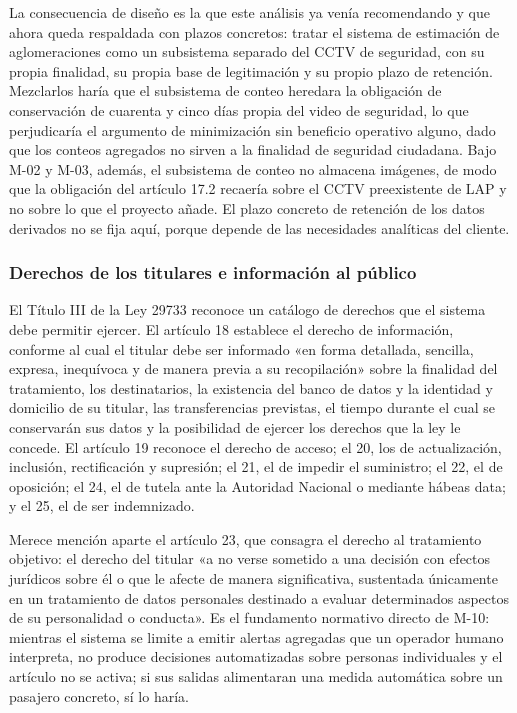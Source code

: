 La consecuencia de diseño es la que este análisis ya venía recomendando
y que ahora queda respaldada con plazos concretos: tratar el sistema de
estimación de aglomeraciones como un subsistema separado del CCTV de
seguridad, con su propia finalidad, su propia base de legitimación y su
propio plazo de retención. Mezclarlos haría que el subsistema de conteo
heredara la obligación de conservación de cuarenta y cinco días propia
del video de seguridad, lo que perjudicaría el argumento de minimización
sin beneficio operativo alguno, dado que los conteos agregados no sirven
a la finalidad de seguridad ciudadana. Bajo M-02 y M-03, además, el
subsistema de conteo no almacena imágenes, de modo que la obligación del
artículo 17.2 recaería sobre el CCTV preexistente de LAP y no sobre lo
que el proyecto añade. El plazo concreto de retención de los datos
derivados no se fija aquí, porque depende de las necesidades analíticas
del cliente.

\subsubsection{Derechos de los titulares e información al público}

El Título III de la Ley 29733 reconoce un catálogo de derechos que el
sistema debe permitir ejercer. El artículo 18 establece el derecho de
información, conforme al cual el titular debe ser informado «en forma
detallada, sencilla, expresa, inequívoca y de manera previa a su
recopilación» sobre la finalidad del tratamiento, los destinatarios, la
existencia del banco de datos y la identidad y domicilio de su titular,
las transferencias previstas, el tiempo durante el cual se conservarán
sus datos y la posibilidad de ejercer los derechos que la ley le
concede. El artículo 19 reconoce el derecho de acceso; el 20, los de
actualización, inclusión, rectificación y supresión; el 21, el de
impedir el suministro; el 22, el de oposición; el 24, el de tutela ante
la Autoridad Nacional o mediante hábeas data; y el 25, el de ser
indemnizado.

Merece mención aparte el artículo 23, que consagra el derecho al
tratamiento objetivo: el derecho del titular «a no verse sometido a una
decisión con efectos jurídicos sobre él o que le afecte de manera
significativa, sustentada únicamente en un tratamiento de datos
personales destinado a evaluar determinados aspectos de su personalidad
o conducta». Es el fundamento normativo directo de M-10: mientras el
sistema se limite a emitir alertas agregadas que un operador humano
interpreta, no produce decisiones automatizadas sobre personas
individuales y el artículo no se activa; si sus salidas alimentaran una
medida automática sobre un pasajero concreto, sí lo haría.

